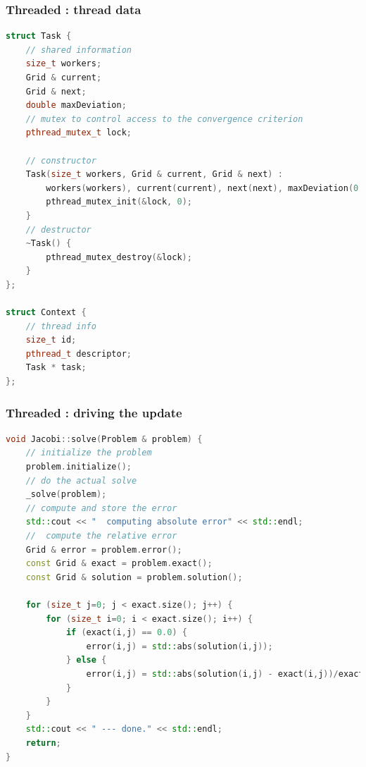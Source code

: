 \begin{frame}[fragile]
% 
  \frametitle{Threaded : thread data}
%
  \begin{lstlisting}[language=c++,name=Jacobi:threaded]
struct Task {
    // shared information 
    size_t workers;
    Grid & current;
    Grid & next;
    double maxDeviation;
    // mutex to control access to the convergence criterion
    pthread_mutex_t lock; 

    // constructor
    Task(size_t workers, Grid & current, Grid & next) :
        workers(workers), current(current), next(next), maxDeviation(0.0) {
        pthread_mutex_init(&lock, 0);
    }
    // destructor
    ~Task() {
        pthread_mutex_destroy(&lock);
    }
};

struct Context {
    // thread info
    size_t id;
    pthread_t descriptor;
    Task * task;
};

  \end{lstlisting}
%
\end{frame}

\begin{frame}[fragile]
% 
  \frametitle{Threaded : driving the update}
%
  \begin{lstlisting}[language=c++,name=Jacobi:threaded]
void Jacobi::solve(Problem & problem) {
    // initialize the problem
    problem.initialize();
    // do the actual solve
    _solve(problem);
    // compute and store the error
    std::cout << "  computing absolute error" << std::endl;
    //  compute the relative error
    Grid & error = problem.error();
    const Grid & exact = problem.exact();
    const Grid & solution = problem.solution();

    for (size_t j=0; j < exact.size(); j++) {
        for (size_t i=0; i < exact.size(); i++) {
            if (exact(i,j) == 0.0) {
                error(i,j) = std::abs(solution(i,j));
            } else {
                error(i,j) = std::abs(solution(i,j) - exact(i,j))/exact(i,j);
            }
        }
    }
    std::cout << " --- done." << std::endl;
    return;
}
  \end{lstlisting}
%
\end{frame}

